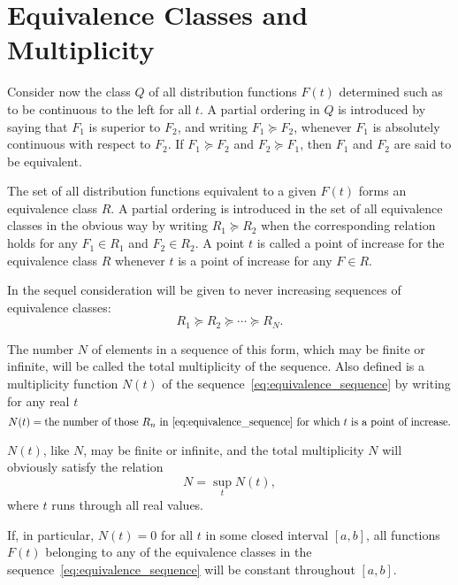 \documentclass[11pt]{article}
\begin{document}
\section{Equivalence Classes and Multiplicity}

Consider now the class $Q$ of all distribution functions $F(t)$ determined such as to be continuous to the left for all $t$. A partial ordering in $Q$ is introduced by saying that $F_1$ is superior to $F_2$, and writing $F_1 \succeq F_2$, whenever $F_1$ is absolutely continuous with respect to $F_2$. If $F_1 \succeq F_2$ and $F_2 \succeq F_1$, then $F_1$ and $F_2$ are said to be equivalent.

The set of all distribution functions equivalent to a given $F(t)$ forms an equivalence class $R$. A partial ordering is introduced in the set of all equivalence classes in the obvious way by writing $R_1 \succeq R_2$ when the corresponding relation holds for any $F_1 \in R_1$ and $F_2 \in R_2$. A point $t$ is called a point of increase for the equivalence class $R$ whenever $t$ is a point of increase for any $F \in R$.

In the sequel consideration will be given to never increasing sequences of equivalence classes:
\begin{equation}
R_1 \succeq R_2 \succeq \cdots \succeq R_N.
\label{eq:equivalence_sequence}
\end{equation}

The number $N$ of elements in a sequence of this form, which may be finite or infinite, will be called the total multiplicity of the sequence. Also defined is a multiplicity function $N(t)$ of the sequence~\eqref{eq:equivalence_sequence} by writing for any real $t$
\begin{equation}
N(t) = \text{the number of those } R_n \text{ in } \eqref{eq:equivalence_sequence} \text{ for which } t \text{ is a point of increase}.
\label{eq:multiplicity_function}
\end{equation}

$N(t)$, like $N$, may be finite or infinite, and the total multiplicity $N$ will obviously satisfy the relation
\begin{equation}
N = \sup_t N(t),
\label{eq:total_multiplicity}
\end{equation}
where $t$ runs through all real values.

If, in particular, $N(t) = 0$ for all $t$ in some closed interval $[a, b]$, all functions $F(t)$ belonging to any of the equivalence classes in the sequence~\eqref{eq:equivalence_sequence} will be constant throughout $[a, b]$.
\end{document}
